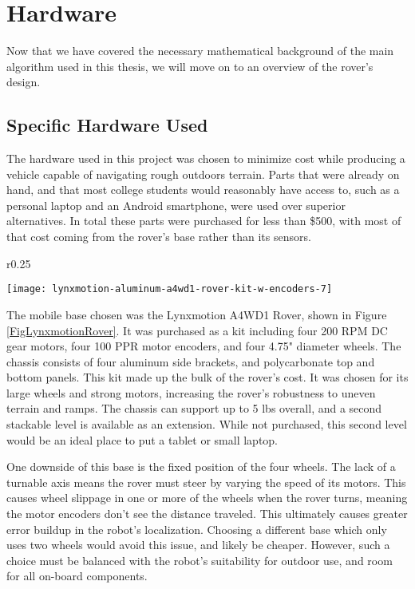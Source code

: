 \chapter{Hardware}

Now that we have covered the necessary mathematical background of the main algorithm used in this thesis, we will move on to an overview of the rover's design. 
\section{Specific Hardware Used} \label{sectionSpecificHardware}
The hardware used in this project was chosen to minimize cost while producing a vehicle capable of navigating rough outdoors terrain. Parts that were already on hand, and that most college students would reasonably have access to, such as a personal laptop and an Android smartphone, were used over superior alternatives. In total these parts were purchased for less than \$500, with most of that cost coming from the rover's base rather than its sensors.

\begin{wrapfigure}{r}{0.25\textwidth} %
	\caption{\cite{fig_lynxmotion_rover}}
	\centering
	\texttt{[image: lynxmotion-aluminum-a4wd1-rover-kit-w-encoders-7]}
	\label{FigLynxmotionRover}
\end{wrapfigure}

The mobile base chosen was the Lynxmotion A4WD1 Rover, shown in Figure \ref{FigLynxmotionRover}. It was purchased as a kit including four 200 RPM DC gear motors, four 100 PPR motor encoders, and four 4.75" diameter wheels. The chassis consists of four aluminum side brackets, and polycarbonate top and bottom panels. This kit made up the bulk of the rover's cost. It was chosen for its large wheels and strong motors, increasing the rover's robustness to uneven terrain and ramps. The chassis can support up to 5 lbs overall, and a second stackable level is available as an extension. While not purchased, this second level would be an ideal place to put a tablet or small laptop.

One downside of this base is the fixed position of the four wheels. The lack of a turnable axis means the rover must steer by varying the speed of its motors. This causes wheel slippage in one or more of the wheels when the rover turns, meaning the motor encoders don't see the distance traveled. This ultimately causes greater error buildup in the robot's localization. Choosing a different base which only uses two wheels would avoid this issue, and likely be cheaper. However, such a choice must be balanced with the robot's suitability for outdoor use, and room for all on-board components.

